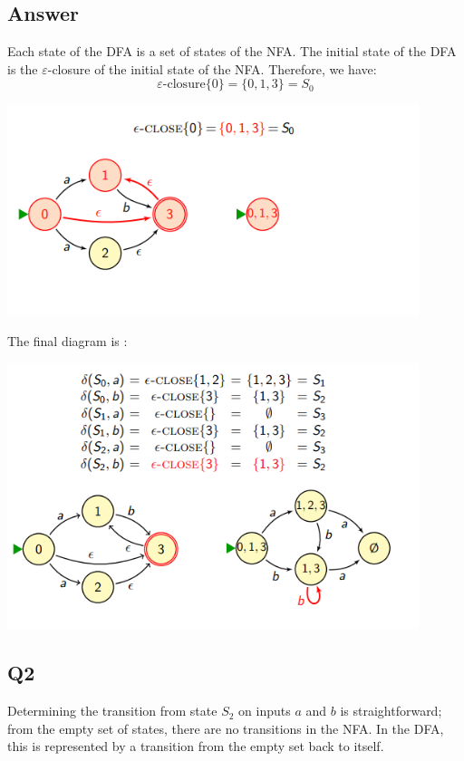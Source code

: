 \documentclass{article}
\begin{document}
\newpage
\subsection*{Answer}
Each state of the DFA is a set of states of the NFA. The initial state of the DFA is the \(\varepsilon\)-closure of the initial state of the NFA. Therefore, we have:
\[\varepsilon\text{-closure}\{0\} = \{0, 1, 3\} = S_0\]

\begin{center}
    \includegraphics[width=12cm]{4.png}
\end{center}



The final diagram is : 
\begin{center}
    \includegraphics[width=12cm]{5.png}
\end{center}
\newpage
\subsection*{Q2}

Determining the transition from state \( S_2 \) on inputs \( a \) and \( b \) is straightforward; from the empty set of states, there are no transitions in the NFA. In the DFA, this is represented by a transition from the empty set back to itself.
\end{document}
